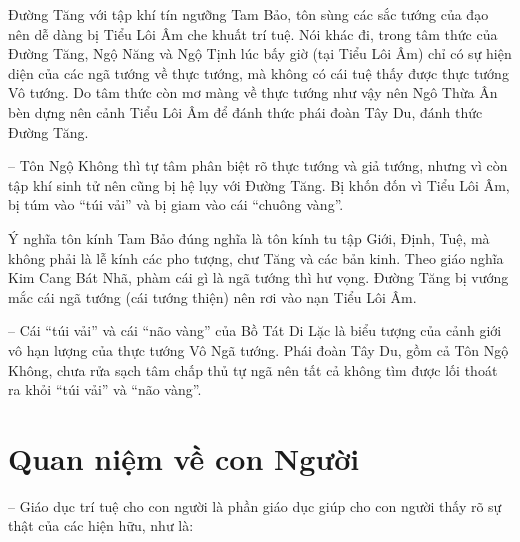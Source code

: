 Đường Tăng với tập khí tín ngưỡng Tam Bảo, tôn sùng các sắc tướng của đạo nên dễ dàng bị Tiểu Lôi Âm che khuất trí tuệ. Nói khác đi, trong tâm thức của Đường Tăng, Ngộ Năng và Ngộ Tịnh lúc bấy giờ (tại Tiểu Lôi Âm) chỉ có sự hiện diện của các ngã tướng về thực tướng, mà không có cái tuệ thấy được thực tướng Vô tướng. Do tâm thức còn mơ màng về thực tướng như vậy nên Ngô Thừa Ân bèn dựng nên cảnh Tiểu Lôi Âm để đánh thức phái đoàn Tây Du, đánh thức Đường Tăng.

-- Tôn Ngộ Không thì tự tâm phân biệt rõ thực tướng và giả tướng, nhưng vì còn tập khí sinh tử nên cũng bị hệ lụy với Đường Tăng. Bị khốn đốn vì Tiểu Lôi Âm, bị túm vào ``túi vải'' và bị giam vào cái ``chuông vàng''.

Ý nghĩa tôn kính Tam Bảo đúng nghĩa là tôn kính tu tập Giới, Định, Tuệ, mà không phải là lễ kính các pho tượng, chư Tăng và các bản kinh. Theo giáo nghĩa Kim Cang Bát Nhã, phàm cái gì là ngã tướng thì hư vọng. Đường Tăng bị vướng mắc cái ngã tướng (cái tướng thiện) nên rơi vào nạn Tiểu Lôi Âm.

-- Cái ``túi vải'' và cái ``não vàng'' của Bồ Tát Di Lặc là biểu tượng của cảnh giới vô hạn lượng của thực tướng Vô Ngã tướng. Phái đoàn Tây Du, gồm cả Tôn Ngộ Không, chưa rửa sạch tâm chấp thủ tự ngã nên tất cả không tìm được lối thoát ra khỏi ``túi vải'' và ``não vàng''.

\section{Quan niệm về con Người} %
\label{sec:65_66_con_nguoi}

-- Giáo dục trí tuệ cho con người là phần giáo dục giúp cho con người thấy rõ sự thật của các hiện hữu, như là:

